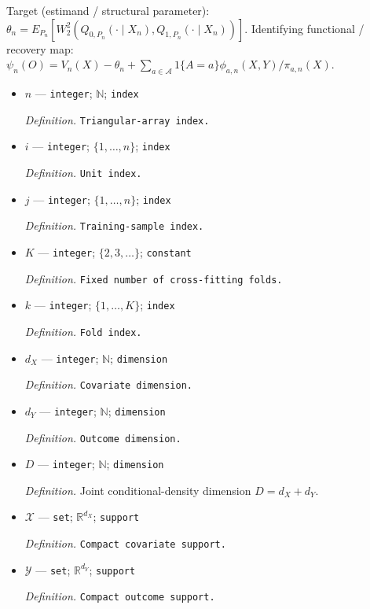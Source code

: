 \documentclass{article}
\begin{document}
Target (estimand / structural parameter): \(\theta_n=E_{P_n}[W_2^2(Q_{0,P_n}(\cdot\mid X_n),Q_{1,P_n}(\cdot\mid X_n))]\).
Identifying functional / recovery map: \(\psi_n(O)=V_n(X)-\theta_n+\sum_{a\in\mathcal A}1\{A=a\}\phi_{a,n}(X,Y)/\pi_{a,n}(X)\).
\begin{itemize}
  \item \(n\) --- \texttt{integer}; \(\mathbb N\); \texttt{index}
  \par\smallskip\noindent\emph{Definition.} \texttt{Triangular-\allowbreak{}array index.}
  \item \(i\) --- \texttt{integer}; \(\{1,\ldots,n\}\); \texttt{index}
  \par\smallskip\noindent\emph{Definition.} \texttt{Unit index.}
  \item \(j\) --- \texttt{integer}; \(\{1,\ldots,n\}\); \texttt{index}
  \par\smallskip\noindent\emph{Definition.} \texttt{Training-\allowbreak{}sample index.}
  \item \(K\) --- \texttt{integer}; \(\{2,3,\ldots\}\); \texttt{constant}
  \par\smallskip\noindent\emph{Definition.} \texttt{Fixed number of cross-\allowbreak{}fitting folds.}
  \item \(k\) --- \texttt{integer}; \(\{1,\ldots,K\}\); \texttt{index}
  \par\smallskip\noindent\emph{Definition.} \texttt{Fold index.}
  \item \(d_X\) --- \texttt{integer}; \(\mathbb N\); \texttt{dimension}
  \par\smallskip\noindent\emph{Definition.} \texttt{Covariate dimension.}
  \item \(d_Y\) --- \texttt{integer}; \(\mathbb N\); \texttt{dimension}
  \par\smallskip\noindent\emph{Definition.} \texttt{Outcome dimension.}
  \item \(D\) --- \texttt{integer}; \(\mathbb N\); \texttt{dimension}
  \par\smallskip\noindent\emph{Definition.} Joint conditional-density dimension \(D=d_X+d_Y\).
  \item \(\mathcal X\) --- \texttt{set}; \(\mathbb R^{d_X}\); \texttt{support}
  \par\smallskip\noindent\emph{Definition.} \texttt{Compact covariate support.}
  \item \(\mathcal Y\) --- \texttt{set}; \(\mathbb R^{d_Y}\); \texttt{support}
  \par\smallskip\noindent\emph{Definition.} \texttt{Compact outcome support.}

\end{itemize}
\end{document}
